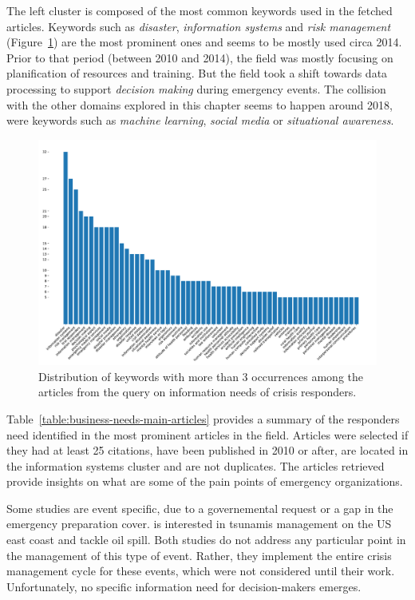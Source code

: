 The left cluster is composed of the most common keywords used in the fetched articles.
Keywords such as \emph{disaster}, \emph{information systems} and \emph{risk management} (Figure~\ref{literature:business-needs-bar}) are the most prominent ones and seems to be mostly used circa 2014.
Prior to that period (between 2010 and 2014), the field was mostly focusing on planification of resources and training.
But the field took a shift towards data processing to support \emph{decision making} during emergency events.
The collision with the other domains explored in this chapter seems to happen around 2018, were keywords such as \emph{machine learning}, \emph{social media} or \emph{situational awareness}.

\begin{figure}[htb]
    \centering
    \includegraphics[width=\textwidth]{figures/chap-2/business-needs-bar.pdf}
    \caption{Distribution of keywords with more than 3 occurrences among the articles from the query on information needs of crisis responders.}
    \label{literature:business-needs-bar}
\end{figure}

Table~\ref{table:business-needs-main-articles} provides a summary of the responders need identified in the most prominent articles in the field.
Articles were selected if they had at least 25 citations, have been published in 2010 or after, are located in the information systems cluster and are not duplicates.
The articles retrieved provide insights on what are some of the pain points of emergency organizations.

Some studies are event specific, due to a governemental request or a gap in the emergency preparation cover.
\textcite{lindellTsunamiPreparednessOregon2010a} is interested in tsunamis management on the US east coast and \textcite{cabreraaguileraModellingPerformanceVariabilities2016a} tackle oil spill.
Both studies do not address any particular point in the management of this type of event.
Rather, they implement the entire crisis management cycle for these events, which were not considered until their work.
Unfortunately, no specific information need for decision-makers emerges.


